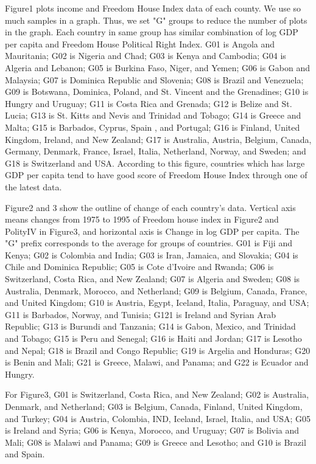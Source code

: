 \documentclass[a4paper,11pt]{article}
\begin{document}
Figure1 plots income and Freedom House Index data of each county. We use so much samples in a graph. Thus, we set "G" groups to reduce the number of plots in the graph. Each country in same group has similar combination of log GDP per capita and Freedom House Political Right Index. G01 is Angola and Mauritania; G02 is Nigeria and Chad; G03 is Kenya and Cambodia; G04 is Algeria and Lebanon; G05 is Burkina Faso, Niger, and Yemen; G06 is Gabon and Malaysia; G07 is Dominica Republic and Slovenia; G08 is Brazil and Venezuela; G09 is Botswana, Dominica, Poland, and St. Vincent and the Grenadines; G10 is Hungry and Uruguay; G11 is Costa Rica and Grenada; G12 is Belize and St. Lucia; G13 is St. Kitts and Nevis and Trinidad and Tobago; G14 is Greece and Malta; G15 is Barbados, Cyprus, Spain , and Portugal; G16 is Finland, United Kingdom, Ireland, and New Zealand; G17 is Australia, Austria, Belgium, Canada, Germany, Denmark, France, Israel, Italia, Netherland, Norway, and Sweden; and G18 is Switzerland and USA. According to this figure, countries which has large GDP per capita tend to have good score of Freedom House Index through one of the latest data.


Figure2 and 3 show the outline of change of each country’s data. Vertical axis means changes from 1975 to 1995 of Freedom house index in Figure2 and PolityI\hspace{-.1em}V in Figure3, and horizontal axis is Change in log GDP per capita. The "G" prefix corresponds to the average for groups of countries. G01 is Fiji and Kenya; G02 is Colombia and India; G03 is Iran, Jamaica, and Slovakia; G04 is Chile and Dominica Republic; G05 is Cote d’Ivoire and Rwanda; G06 is Switzerland, Costa Rica, and New Zealand; G07 is Algeria and Sweden; G08 is Australia, Denmark, Morocco, and Netherland; G09 is Belgium, Canada, France, and United Kingdom; G10 is Austria, Egypt, Iceland, Italia, Paraguay, and USA; G11 is Barbados, Norway, and Tunisia; G121 is Ireland and Syrian Arab Republic; G13 is Burundi and Tanzania; G14 is Gabon, Mexico, and Trinidad and Tobago; G15 is Peru and Senegal; G16 is Haiti and Jordan; G17 is Lesotho and Nepal; G18 is Brazil and Congo Republic; G19 is Argelia and Honduras; G20 is Benin and Mali; G21 is Greece, Malawi, and Panama; and G22 is Ecuador and Hungry.


For Figure3, G01 is Switzerland, Costa Rica, and New Zealand; G02 is Australia, Denmark, and Netherland; G03 is Belgium, Canada, Finland, United Kingdom, and Turkey; G04 is Austria, Colombia, IND, Iceland, Israel, Italia, and USA; G05 is Ireland and Syria; G06 is Kenya, Morocco, and Uruguay; G07 is Bolivia and Mali; G08 is Malawi and Panama; G09 is Greece and Lesotho; and G10 is Brazil and Spain. 
\end{document}
